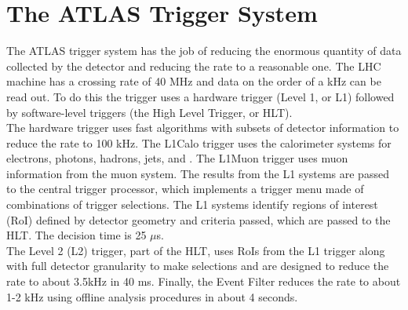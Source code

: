 %

  


\section{The ATLAS Trigger System}

The ATLAS trigger system has the job of reducing the enormous quantity of data collected by the detector and reducing the rate to a reasonable one.  The LHC machine has a crossing rate of 40 MHz and data on the order of a kHz can be read out.  To do this the trigger uses a hardware trigger (Level 1, or L1) followed by software-level triggers (the High Level Trigger, or HLT).  \\

The hardware trigger uses fast algorithms with subsets of detector information to reduce the rate to 100 kHz.  The L1Calo trigger uses the calorimeter systems for electrons, photons, hadrons, jets, and \met.  The L1Muon trigger uses muon information from the muon system.  The results from the L1 systems are passed to the central trigger processor, which implements a trigger menu made of combinations of trigger selections.    The L1 systems identify regions of interest (RoI) defined by detector geometry and criteria passed, which are passed to the HLT.  The decision time is 25 $\mu$s. \\

The Level 2 (L2) trigger, part of the HLT, uses RoIs from the L1 trigger along with full detector granularity to make selections and are designed to reduce the rate to about 3.5kHz in 40 ms.  Finally, the Event Filter reduces the rate to about 1-2 kHz using offline analysis procedures in about 4 seconds.  \\



